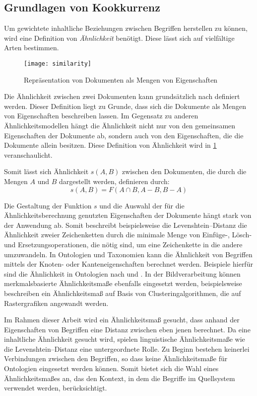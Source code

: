 \subsection{Grundlagen von Kookkurrenz}

Um gewichtete inhaltliche Beziehungen zwischen Begriffen herstellen zu können, wird eine Definition von \emph{Ähnlichkeit} benötigt. Diese lässt sich auf vielfältige Arten bestimmen.

\begin{figure}
\centering
\texttt{[image: similarity]}
\caption{Repräsentation von Dokumenten als Mengen von Eigenschaften}
\label{fig:similarity}
\end{figure}

Die Ähnlichkeit zwischen zwei Dokumenten kann grundsätzlich nach \textcite{at1977} definiert werden. Dieser Definition liegt zu Grunde, dass sich die Dokumente als Mengen von Eigenschaften beschreiben lassen. Im Gegensatz zu anderen Ähnlichkeitsmodellen hängt die Ähnlichkeit nicht nur von den gemeinsamen Eigenschaften der Dokumente ab, sondern auch von den Eigenschaften, die die Dokumente allein besitzen. Diese Definition von Ähnlichkeit wird in \cref{fig:similarity} veranschaulicht.

\label{similarity}
Somit lässt sich Ähnlichkeit \(s(A,B)\) zwischen den Dokumenten, die durch die Mengen \(A\) und \(B\) dargestellt werden, definieren durch:
\[s(A,B) = F(A \cap B, A-B, B-A)\]

Die Gestaltung der Funktion \(s\) und die Auswahl der für die Ähnlichkeitsberechnung genutzten Eigenschaften der Dokumente hängt stark von der Anwendung ab. Somit beschreibt beispielsweise die Levenshtein--Distanz \cite{vl1966} die Ähnlichkeit zweier Zeichenketten durch die minimale Menge von Einfüge-, Lösch- und Ersetzungsoperationen, die nötig sind, um eine Zeichenkette in die andere umzuwandeln. In Ontologien und Taxonomien kann die Ähnlichkeit von Begriffen mittels der Knoten- oder Kanteneigenschaften berechnet werden. Beispiele hierfür sind die Ähnlichkeit in Ontologien nach \textcite{pr1995} und \textcite{ps2002}. In der Bildverarbeitung können merkmalsbasierte Ähnlichkeitsmaße ebenfalls eingesetzt werden, beispielsweise beschreiben \textcite{ow2006} ein Ähnlichkeitsmaß auf Basis von Clusteringalgorithmen, die auf Rastergrafiken angewandt werden.

Im Rahmen dieser Arbeit wird ein Ähnlichkeitsmaß gesucht, dass anhand der Eigenschaften von Begriffen eine Distanz zwischen eben jenen berechnet. Da eine inhaltliche Ähnlichkeit gesucht wird, spielen linguistische Ähnlichkeitsmaße wie die Levenshtein--Distanz eine untergeordnete Rolle. Zu Beginn bestehen keinerlei Verbindungen zwischen den Begriffen, so dass keine Ähnlichkeitsmaße für Ontologien eingesetzt werden können. Somit bietet sich die Wahl eines Ähnlichkeitsmaßes an, das den Kontext, in dem die Begriffe im Quellsystem verwendet werden, berücksichtigt.

